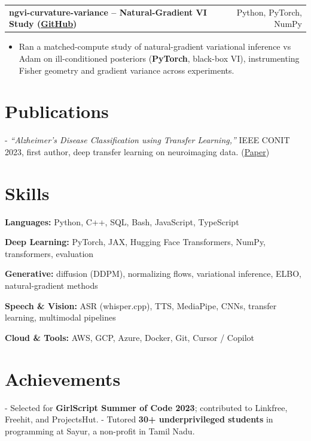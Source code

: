 \documentclass[letterpaper,11pt]{article}
\makeatletter
\newcommand{\projItem}[2]{%
  \vspace{6pt}
  \begin{tabular*}{\textwidth}{@{}l@{\extracolsep{\fill}}r@{}}
    \textbf{#1} & #2 \\
  \end{tabular*}\par\vspace{-2pt}
}
\newcommand{\skillLine}[2]{\textbf{#1:} #2\par\vspace{2pt}}
\newcommand{\inlineBlock}[1]{{\setlength{\leftskip}{0.18in}\small #1\par}}
\makeatother
\begin{document}
\projItem{ngvi-curvature-variance -- Natural-Gradient VI Study {\normalfont\small(\href{https://github.com/Deva-1903/ngvi-curvature-variance}{GitHub})}}{Python, PyTorch, NumPy}
\begin{itemize}
  \item Ran a matched-compute study of natural-gradient variational inference vs Adam on ill-conditioned posteriors (\textbf{PyTorch}, black-box VI), instrumenting Fisher geometry and gradient variance across experiments.
\end{itemize}

\section{Publications}
\inlineBlock{- \textit{``Alzheimer's Disease Classification using Transfer Learning,''} IEEE CONIT 2023, first author, deep transfer learning on neuroimaging data. {\normalfont\small(\href{https://ieeexplore.ieee.org/document/10205760}{Paper})}}

\section{Skills}
\skillLine{Languages}{Python, C++, SQL, Bash, JavaScript, TypeScript}
\skillLine{Deep Learning}{PyTorch, JAX, Hugging Face Transformers, NumPy, transformers, evaluation}
\skillLine{Generative}{diffusion (DDPM), normalizing flows, variational inference, ELBO, natural-gradient methods}
\skillLine{Speech \& Vision}{ASR (whisper.cpp), TTS, MediaPipe, CNNs, transfer learning, multimodal pipelines}
\skillLine{Cloud \& Tools}{AWS, GCP, Azure, Docker, Git, Cursor / Copilot}

\section{Achievements}
\inlineBlock{- Selected for \textbf{GirlScript Summer of Code 2023}; contributed to Linkfree, Freehit, and ProjectsHut. - Tutored \textbf{30+ underprivileged students} in programming at Sayur, a non-profit in Tamil Nadu.}
\end{document}
